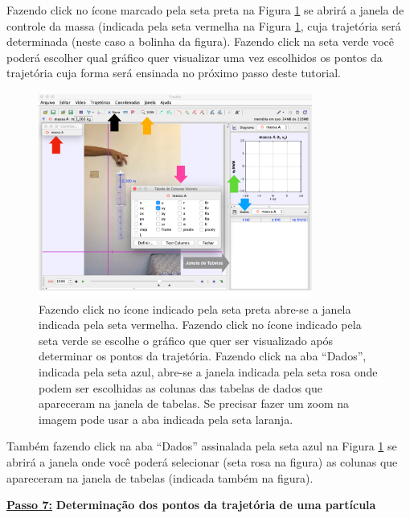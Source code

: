 \documentclass[12pt]{article}
\begin{document}
Fazendo click no ícone marcado pela seta preta na Figura \ref{fig8AppB} se abrirá a janela de controle 
 da massa (indicada pela seta vermelha  na Figura \ref{fig8AppB}, cuja trajetória será determinada (neste caso a bolinha da figura). Fazendo click na seta verde você poderá escolher qual gráfico 
 quer visualizar uma vez escolhidos os pontos da trajetória cuja forma será ensinada no próximo passo deste tutorial.
\begin{figure}[h!]
\includegraphics[width=9cm]{fig8AppB.pdf}
\caption{Fazendo click no ícone indicado pela seta preta abre-se a janela indicada pela seta vermelha. Fazendo click no ícone indicado pela seta verde se escolhe o gráfico que quer ser visualizado 
após determinar os pontos da trajetória. Fazendo click na aba ``Dados'', indicada pela seta azul, 
abre-se a janela indicada pela seta rosa onde podem ser escolhidas as colunas das tabelas de dados que apareceram na janela de tabelas. Se precisar fazer um zoom na imagem pode usar a aba indicada pela seta laranja.}
\label{fig8AppB}
\end{figure}
Também fazendo click na aba ``Dados'' assinalada pela seta azul na  Figura \ref{fig8AppB} se abrirá a janela onde você poderá selecionar (seta rosa na figura) as colunas que apareceram na janela de tabelas (indicada também na figura).

\underline{\bf Passo 7:} {\bf Determinação dos pontos da trajetória de uma partícula}\\
\indent
\end{document}
